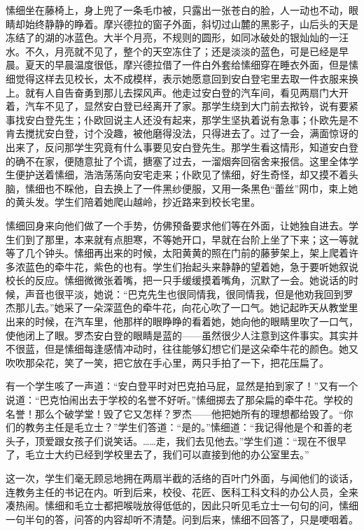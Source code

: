 \par 愫细坐在藤椅上，身上兜了一条毛巾被，只露出一张苍白的脸，人一动也不动，眼睛却始终静静的睁着。摩兴德拉的窗子外面，斜切过山麓的黑影子，山后头的天是冻结了的湖的冰蓝色。大半个月亮，不规则的圆形，如同冰破处的银灿灿的一汪水。不久，月亮就不见了，整个的天空冻住了；还是淡淡的蓝色，可是已经是早晨。夏天的早晨温度很低，摩兴德拉借了一件白外套给愫细穿在睡衣外面，但是愫细觉得这样去见校长，太不成模样，表示她愿意回到安白登宅里去取一件衣服来换上。就有人自告奋勇到那儿去探风声。他走过安白登的汽车间，看见两扇门大开着，汽车不见了，显然安白登已经离开了家。那学生绕到大门前去揿铃，说有要紧事找安白登先生；仆欧回说主人还没有起来，那学生坚执着说有急事；仆欧先是不肯去搅扰安白登，讨个没趣，被他磨得没法，只得进去了。过了一会，满面惊讶的出来了，反问那学生究竟有什么事要见安白登先生。那学生看这情形，知道安白登的确不在家，便随意扯了个谎，搪塞了过去，一溜烟奔回宿舍来报信。这里全体学生便护送着愫细，浩浩荡荡向安宅走来；仆欧见了愫细，好生奇怪，却又摸不着头脑，愫细也不睬他，自去换上了一件黑纱便服，又用一条黑色“蕾丝”网巾，束上她的黄头发。学生们陪着她爬山越岭，抄近路来到校长宅里。
\par 愫细回身来向他们做了一个手势，仿佛预备要求他们等在外面，让她独自进去。学生们到了那里，本来就有点胆寒，不等她开口，早就在台阶上坐了下来；这一等就等了几个钟头。愫细再出来的时候，太阳黄黄的照在门前的藤萝架上，架上爬着许多浓蓝色的牵牛花，紫色的也有。学生们抬起头来静静的望着她，急于要听她叙说校长的反应。愫细微微张着嘴，把一只手缓缓摸着嘴角，沉默了一会。她说话的时候，声音也很平淡，她说：“巴克先生也很同情我，很同情我，但是他劝我回到罗杰那儿去。”她采了一朵深蓝色的牵牛花，向花心吹了一口气。她记起昨天从教堂里出来的时候，在汽车里，他那样的眼睁睁的看着她，她向他的眼睛里吹了一口气，使他闭上了眼。罗杰安白登的眼睛是蓝的——虽然很少人注意到这件事实。其实并不很蓝，但是愫细每逢感情冲动时，往往能够幻想它们是这朵牵牛花的颜色。她又吹吹那朵花，笑了一笑，把它放在手心里，两只手拍了一下，把花压扁了。
\par 有一个学生咳了一声道：“安白登平时对巴克拍马屁，显然是拍到家了！”又有一个说道：“巴克怕闹出去于学校的名誉不好听。”愫细掷去了那朵扁的牵牛花。学校的名誉！那么个破学堂！毁了它又怎样？罗杰——他把她所有的理想都给毁了。“你们的教务主任是毛立士？”学生们答道：“是的。”愫细道：“我记得他是个和善的老头子，顶爱跟女孩子们说笑话。……走，我们去见他去。”学生们道：“现在不很早了，毛立士大约已经到学校里去了，我们可以直接到他的办公室里去。”
\par 这一次，学生们毫无顾忌地拥在两扇半截的活络的百叶门外面，与闻他们的谈话，连教务主任的书记在内。听到后来，校役、花匠、医科工科文科的办公人员，全来凑热闹。愫细和毛立士都把喉咙放得低低的，因此只听见毛立士一句句的问，愫细一句半句的答，问答的内容却听不清楚。问到后来，愫细不回答了，只是哽咽着。
